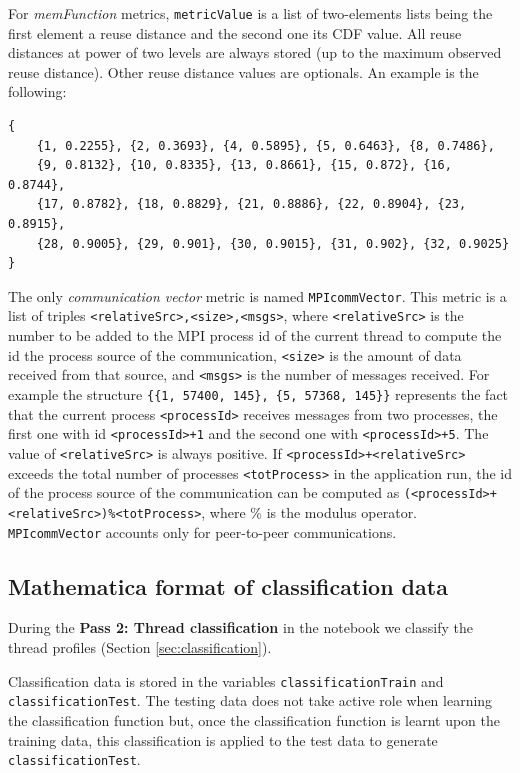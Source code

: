 \documentclass[a4paper, 10pt]{article}
\begin{document}
For \textit{memFunction} metrics, \verb!metricValue! is a list of two-elements lists being the first element a reuse distance and the second one
its CDF value. All reuse distances at power of two levels are always stored (up to the maximum observed reuse distance). Other reuse distance values
are optionals. An example is the following:
\begin{Verbatim}[obeytabs, tabsize=4, frame=lines]
{
	{1, 0.2255}, {2, 0.3693}, {4, 0.5895}, {5, 0.6463}, {8, 0.7486},
	{9, 0.8132}, {10, 0.8335}, {13, 0.8661}, {15, 0.872}, {16, 0.8744},
	{17, 0.8782}, {18, 0.8829}, {21, 0.8886}, {22, 0.8904}, {23, 0.8915}, 
	{28, 0.9005}, {29, 0.901}, {30, 0.9015}, {31, 0.902}, {32, 0.9025}
}
\end{Verbatim}

The only \textit{communication vector} metric is named \texttt{MPIcommVector}. This metric is a list of triples \texttt{<relativeSrc>,<size>,<msgs>},
where \texttt{<relativeSrc>} is the number to be added to the MPI process id of the current thread to compute the id the process
source of the communication, \texttt{<size>} is the amount of data received from that source, and \texttt{<msgs>} is the number of messages
received. For example the structure \verb!{{1, 57400, 145}, {5, 57368, 145}}! represents the fact that the current process \verb!<processId>!
receives messages from two processes, the first one with id \verb!<processId>+1! and the second one with \verb!<processId>+5!. The value of 
\texttt{<relativeSrc>} is always positive. If \verb!<processId>+<relativeSrc>! exceeds the total number of processes \verb!<totProcess>! in the application run,
the id of the process source of the communication can be computed as \texttt{(<processId>+<relativeSrc>)\%<totProcess>}, where \% is the modulus operator.
\texttt{MPIcommVector} accounts only for peer-to-peer communications.



\subsection{Mathematica format of classification data}
\label{apx:clusteringStructure}

During the \textbf{Pass 2: Thread classification} in the \ex notebook we classify the thread profiles (Section \ref{sec:classification}).

Classification data is stored in the variables \texttt{classificationTrain} and \texttt{classificationTest}. The testing data does
not take active role when learning the classification function but, once the classification function is learnt upon the training data,
this classification is applied to the test data to generate \texttt{classificationTest}.
\end{document}
